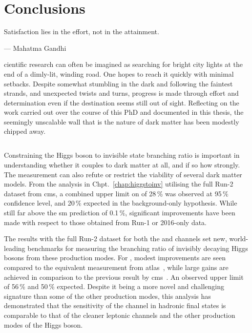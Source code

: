 \chapter{Conclusions}
\label{chap:conclusions}

\epigraph{Satisfaction lies in the effort, not in the attainment.}{--- Mahatma Gandhi}

cientific research can often be imagined as searching for bright city lights at the end of a dimly-lit, winding road. One hopes to reach it quickly with minimal setbacks. Despite somewhat stumbling in the dark and following the faintest strands, and unexpected twists and turns, progress is made through effort and determination even if the destination seems still out of sight. Reflecting on the work carried out over the course of this PhD and documented in this thesis, the seemingly unscalable wall that is the nature of dark matter has been modestly chipped away.




\section{\texorpdfstring{\higgstoinv}{Higgs to invisible}}
\label{sec:conclusions_htoinv}

Constraining the Higgs boson to invisible state branching ratio is important in understanding whether it couples to dark matter at all, and if so how strongly. The measurement can also refute or restrict the viability of several dark matter models. From the analysis in Chpt.~\ref{chap:higgstoinv} utilising the full Run-2 dataset from \acrshort{cms}, a combined upper limit on \BRHinvFull of 28\,\% was observed at 95\,\% confidence level, and 20\,\% expected in the background-only hypothesis. While still far above the \acrlong{sm} prediction of 0.1\,\%, significant improvements have been made with respect to those obtained from Run-1 or 2016-only data.

The results with the full Run-2 dataset for both the \ttH and \VH channels set new, world-leading benchmarks for measuring the branching ratio of invisibly decaying Higgs bosons from these production modes. For \ttH, modest improvements are seen compared to the equivalent measurement from \acrshort{atlas}~\cite{ATLAS:2020kdi}, while large gains are achieved in comparison to the previous result by \acrshort{cms}~\cite{CMS-PAS-HIG-18-008}. An observed upper limit of 56\,\% and 50\,\% expected. Despite it being a more novel and challenging signature than some of the other production modes, this analysis has demonstrated that the sensitivity of the \ttH channel in hadronic final states is comparable to that of the cleaner leptonic channels and the other production modes of the Higgs boson.

